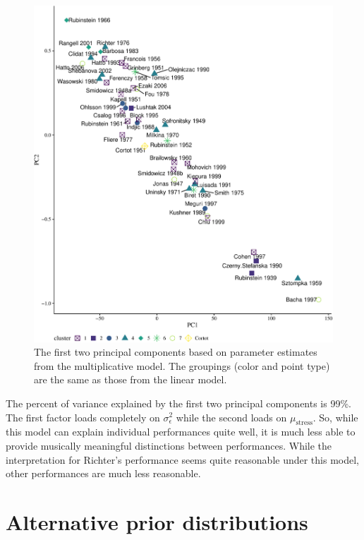 \documentclass[aoas]{imsart}
\begin{document}
\begin{figure}

{\centering \includegraphics[width=5in]{gfx/mult-par-clusts-1} 

}

\caption{The first two principal components based on parameter estimates from the multiplicative model. The groupings (color and point type) are the same as those from the linear model.}\label{fig:mult-par-clusts}
\end{figure}

The percent of variance explained by the first two principal components
is 99\%. The first factor loads completely on \(\sigma^2_{\epsilon}\)
while the second loads on \(\mu_{\textrm{stress}}\). So, while this
model can explain individual performances quite well, it is much less
able to provide musically meaningful distinctions between performances.
While the interpretation for Richter's performance seems quite
reasonable under this model, other performances are much less
reasonable.

\hypertarget{alternative-prior-distributions}{%
\section{Alternative prior
distributions}\label{alternative-prior-distributions}}
\end{document}
